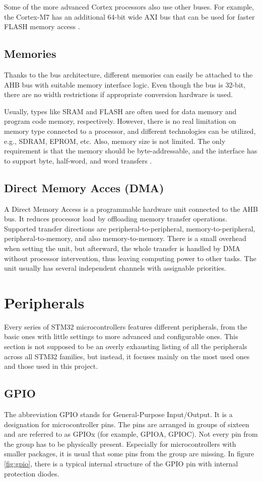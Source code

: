 Some of the more advanced Cortex processors also use other buses. For example, the Cortex-M7 has an additional 64-bit wide AXI bus that can be used for faster FLASH memory access \cite{m7_web}. 

	\subsection{Memories}
	\label{sub:memories}
Thanks to the bus architecture, different memories can easily be attached to the AHB bus with suitable memory interface logic. Even though the bus is 32-bit, there are no width restrictions if appropriate conversion hardware is used.

Usually, types like SRAM and FLASH are often used for data memory and program code memory, respectively. However, there is no real limitation on memory type connected to a processor, and different technologies can be utilized, e.g., SDRAM, EPROM, etc. Also, memory size is not limited. The only requirement is that the memory should be byte-addressable, and the interface has to support byte, half-word, and word transfers \cite{yu}.

	\subsection{Direct Memory Acces (DMA)}
	\label{sub:dma}
A Direct Memory Access is a programmable hardware unit connected to the AHB bus. It reduces processor load by offloading memory transfer operations. Supported transfer directions are peripheral-to-peripheral, memory-to-peripheral, peripheral-to-memory, and also memory-to-memory. There is a small overhead when setting the unit, but afterward, the whole transfer is handled by DMA without processor intervention, thus leaving computing power to other tasks. The unit usually has several independent channels with assignable priorities.


\section{Peripherals}
\label{sec:stm_periph}
Every series of STM32 microcontrollers features different peripherals, from the basic ones with little settings to more advanced and configurable ones. This section is not supposed to be an overly exhausting listing of all the peripherals across all STM32 families, but instead, it focuses mainly on the most used ones and those used in this project.

	\subsection{GPIO}
	\label{sub:gpio}
The abbreviation GPIO stands for General-Purpose Input/Output. It is a designation for microcontroller pins. The pins are arranged in groups of sixteen and are referred to as GPIOx (for example, GPIOA, GPIOC). Not every pin from the group has to be physically present. Especially for microcontrollers with smaller packages, it is usual that some pins from the group are missing. In figure \ref{fig:gpio}, there is a typical internal structure of the GPIO pin with internal protection diodes.

